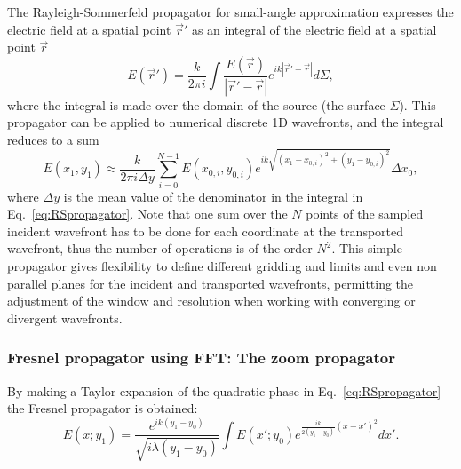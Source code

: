 \documentclass[preprint]{iucr}
\begin{document}
The Rayleigh-Sommerfeld propagator for small-angle approximation expresses the electric field at a spatial point $\vec{r}'$ as an integral of the electric field at a spatial point $\vec{r}$ \cite{goodmanfourier}
\begin{equation}\label{eq:RSpropagator}
E(\vec{r}') =  \frac{k}{2 \pi i} \int \frac{E(\vec{r})}{|\vec{r}'-\vec{r}|} e^{ i k |\vec{r}' - \vec{r}|  }  d\Sigma,
\end{equation}
where the integral is made over the domain of the source (the surface $\Sigma$). 
This propagator can be applied to numerical discrete 1D wavefronts, and the integral reduces to a sum
\begin{equation}\label{eq:discreteRSpropagator}
E(x_1,y_1) \approx \frac{k}{2 \pi i \Delta y}  \sum_{i=0}^{N-1}  E(x_{0,i},y_{0,i}) e^{i k \sqrt{(x_1 - x_{0,i})^2 + (y_1 - y_{0,i})^2} }  \Delta x_0,
\end{equation}
where $\Delta y$ is the mean value of the denominator in the integral in Eq.~\ref{eq:RSpropagator}.
Note that one sum over the $N$ points of the sampled incident wavefront has to be done for each coordinate at the transported wavefront, thus the number of operations is of the order $N^2$. This simple propagator gives flexibility to define different gridding and limits and even non parallel planes for the incident and transported wavefronts, permitting the adjustment of the window and resolution when working with converging or divergent wavefronts. 


\subsubsection{Fresnel propagator using FFT: The zoom propagator}
\label{sec:zoomPropagator}


By making a Taylor expansion of the quadratic phase in Eq.~\ref{eq:RSpropagator} the Fresnel propagator is obtained: 
\begin{equation}\label{eq:fresnelPropagator}
E(x;y_1) =  \frac{e^{i k (y_1-y_0)}}{\sqrt{i \lambda (y_1-y_0)}} \int E(x';y_0) e^{ \frac{i k}{2 (y_1-y_0)}  (x-x')^2  }  dx'.
\end{equation}
\end{document}

